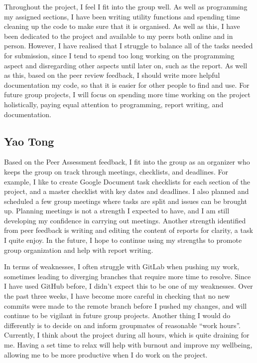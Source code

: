 \documentclass[11pt]{article}
\begin{document}
Throughout the project, I feel I fit into the group well. As well as programming my assigned sections,
I have been writing utility functions and spending time cleaning up the code to make sure that it is 
organised. As well as this, I have been dedicated to the project and available to my peers both online 
and in person. However, I have realised that I struggle to balance all of the tasks needed for submission, 
since I tend to spend too long working on the programming aspect and disregarding other aspects until 
later on, such as the report. As well as this, based on the peer review feedback, I should write more 
helpful documentation my code, so that it is easier for other people to find and use. For future group 
projects, I will focus on spending more time working on the project holistically, paying equal attention 
to programming, report writing, and documentation. 

\subsection{Yao Tong}

Based on the Peer Assessment feedback, I fit into the group as an organizer who keeps the group 
on track through meetings, checklists, and deadlines. For example, I like to create Google 
Document task checklists for each section of the project, and a master checklist with key 
dates and deadlines. I also planned and scheduled a few group meetings where tasks are split 
and issues can be brought up. Planning meetings is not a strength I expected to have, and I 
am still developing my confidence in carrying out meetings. Another strength identified from 
peer feedback is writing and editing the content of reports for clarity, a task I quite enjoy.
In the future, I hope to continue using my strengths to promote group organization and help 
with report writing. 

In terms of weaknesses, I often struggle with GitLab when pushing my work, 
sometimes leading to diverging branches that require more time to resolve. Since I have 
used GitHub before, I didn’t expect this to be one of my weaknesses. Over the past three 
weeks, I have become more careful in checking that no new commits were made to the remote 
branch before I pushed my changes, and will continue to be vigilant in future group projects. 
Another thing I would do differently is to decide on and inform groupmates of reasonable 
``work hours''. Currently, I think about the project during all hours, which is quite 
draining for me. Having a set time to relax will help with burnout and improve my wellbeing, 
allowing me to be more productive when I do work on the project.
\end{document}
